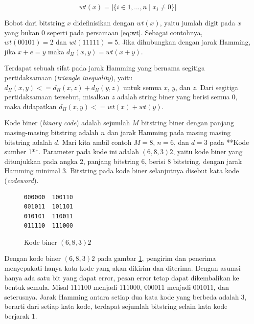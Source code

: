 \documentclass[conference,compsoc]{IEEEtran}
\begin{document}
\begin{equation}
wt(x) = |\{i \in {1,...,n} \mid x_i \neq 0\}|
\label{eq:wt}
\end{equation}

Bobot dari bitstring $x$ didefinisikan dengan $wt(x)$, yaitu jumlah digit pada $x$ yang bukan $0$ seperti pada persamaan \ref{eq:wt}. Sebagai contohnya, $wt(00101) = 2$ dan $wt(11111) = 5$. Jika dihubungkan dengan jarak Hamming, jika $x+e = y$ maka $d_H(x,y) = wt(x+y)$.

Terdapat sebuah sifat pada jarak Hamming yang bernama segitiga pertidaksamaan (\textit{triangle inequality}), yaitu $d_H(x,y) <= d_H(x,z) + d_H(y,z)$ untuk semua $x$, $y$, dan $z$. Dari segitiga pertidaksamaan tersebut, misalkan $z$ adalah string biner yang berisi semua $0$, maka didapatkan $d_H(x,y) <= wt(x) + wt(y)$.

Kode biner (\textit{binary code}) adalah sejumlah $M$ bitstring biner dengan panjang masing-masing bitstring adalah $n$ dan jarak Hamming pada masing masing bitstring adalah $d$. Mari kita ambil contoh $M=8$, $n=6$, dan $d=3$ pada **Kode sumber 1**. Parameter pada kode ini adalah $(6,8,3)2$, yaitu kode biner yang ditunjukkan pada angka 2, panjang bitstring 6, berisi 8 bitstring, dengan jarak Hamming minimal 3. Bitstring pada kode biner selanjutnya disebut kata kode (\textit{codeword}).


\begin{figure}
\centering
\begin{BVerbatim}
000000  100110
001011  101101
010101  110011
011110  111000
\end{BVerbatim}
\caption{Kode biner $(6,8,3)2$}
\label{fig:binarycode683}
\end{figure}


Dengan kode biner $(6,8,3)2$ pada gambar \ref{fig:binarycode683}, pengirim dan penerima menyepakati hanya kata kode yang akan dikirim dan diterima. Dengan asumsi hanya ada satu bit yang dapat error, pesan error tetap dapat dikembalikan ke bentuk semula. Misal $111100$ menjadi $111000$, $000011$ menjadi $001011$, dan seterusnya. Jarak Hamming antara setiap dua kata kode yang berbeda adalah 3, berarti dari setiap kata kode, terdapat sejumlah bitstring selain kata kode berjarak 1.
\end{document}
